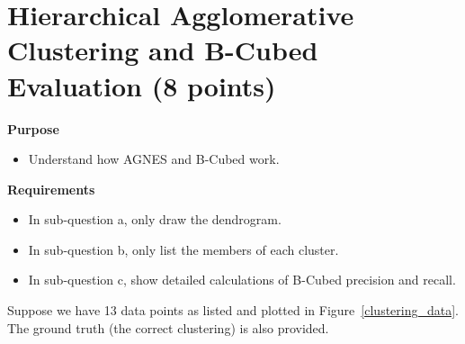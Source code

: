 \section{Hierarchical Agglomerative Clustering and B-Cubed Evaluation (8 points)}
\textbf{Purpose} 
\begin{itemize}
	\item Understand how AGNES and B-Cubed work.
\end{itemize}

\textbf{Requirements}
\begin{itemize}
	
	\item In sub-question a, only draw the dendrogram.
	\item In sub-question b, only list the members of each cluster.
	\item In sub-question c, show detailed calculations of B-Cubed precision and recall.
\end{itemize}

Suppose we have 13 data points as listed and plotted in
Figure~\ref{clustering_data}. The ground truth (the correct clustering) is
also provided. 

